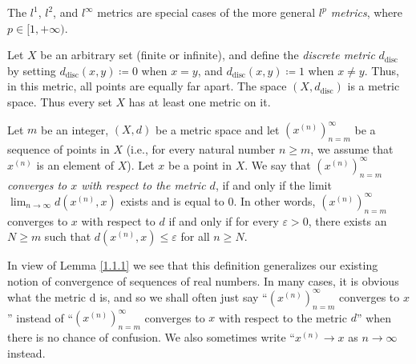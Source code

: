 \begin{remark}\label{1.1.10}
    The \(l^1\), \(l^2\), and \(l^\infty\) metrics are special cases of the more general \emph{\(l^p\) metrics}, where \(p \in [1, +\infty)\).
\end{remark}

\begin{example}\label{1.1.11}
    Let \(X\) be an arbitrary set (finite or infinite), and define the \emph{discrete metric} \(d_{\text{disc}}\) by setting \(d_{\text{disc}}(x, y) \coloneqq 0\) when \(x = y\), and \(d_{\text{disc}}(x, y) \coloneqq 1\) when \(x \neq y\).
    Thus, in this metric, all points are equally far apart.
    The space \((X, d_{\text{disc}})\) is a metric space.
    Thus every set \(X\) has at least one metric on it.
\end{example}

\setcounter{theorem}{13}
\begin{definition}\label{1.1.14}
    Let \(m\) be an integer, \((X, d)\) be a metric space and let \((x^{(n)})_{n = m}^\infty\) be a sequence of points in \(X\)
    (i.e., for every natural number \(n \geq m\), we assume that \(x^{(n)}\) is an element of \(X\)).
    Let \(x\) be a point in \(X\).
    We say that \emph{\((x^{(n)})_{n = m}^\infty\) converges to \(x\) with respect to the metric \(d\)}, if and only if the limit \(\lim_{n \to \infty} d(x^{(n)}, x)\) exists and is equal to \(0\).
    In other words, \((x^{(n)})_{n = m}^\infty\) converges to \(x\) with respect to \(d\) if and only if for every \(\varepsilon > 0\), there exists an \(N \geq m\) such that \(d(x^{(n)}, x) \leq \varepsilon\) for all \(n \geq N\).
\end{definition}

\begin{remark}\label{1.1.15}
    In view of Lemma \ref{1.1.1} we see that this definition generalizes our existing notion of convergence of sequences of real numbers.
    In many cases, it is obvious what the metric d is, and so we shall often just say ``\((x^{(n)})_{n = m}^\infty\) converges to \(x\)'' instead of ``\((x^{(n)})_{n = m}^\infty\) converges to \(x\) with respect to the metric \(d\)'' when there is no chance of confusion.
    We also sometimes write ``\(x^{(n)} \to x\) as \(n \to \infty\) instead.
\end{remark}

